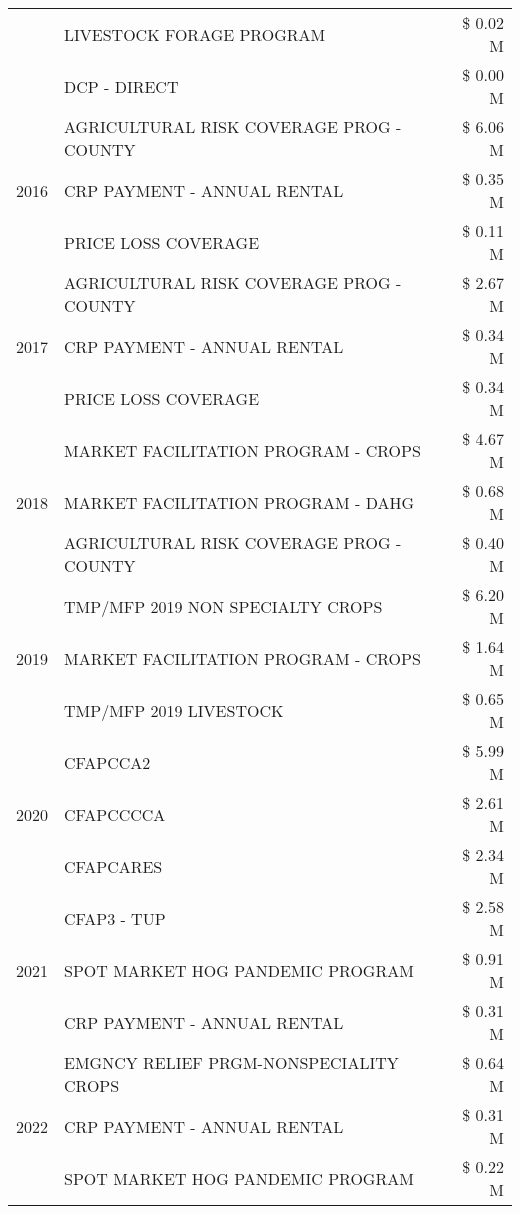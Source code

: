 \begin{tabular}{llr}
 & LIVESTOCK FORAGE PROGRAM & \$ 0.02 M \\
 & DCP - DIRECT & \$ 0.00 M \\
\cline{1-3}
\multirow[t]{3}{*}{2016} & AGRICULTURAL RISK COVERAGE PROG - COUNTY & \$ 6.06 M \\
 & CRP PAYMENT - ANNUAL RENTAL & \$ 0.35 M \\
 & PRICE LOSS COVERAGE & \$ 0.11 M \\
\cline{1-3}
\multirow[t]{3}{*}{2017} & AGRICULTURAL RISK COVERAGE PROG - COUNTY & \$ 2.67 M \\
 & CRP PAYMENT - ANNUAL RENTAL & \$ 0.34 M \\
 & PRICE LOSS COVERAGE & \$ 0.34 M \\
\cline{1-3}
\multirow[t]{3}{*}{2018} & MARKET FACILITATION PROGRAM - CROPS & \$ 4.67 M \\
 & MARKET FACILITATION PROGRAM - DAHG & \$ 0.68 M \\
 & AGRICULTURAL RISK COVERAGE PROG - COUNTY & \$ 0.40 M \\
\cline{1-3}
\multirow[t]{3}{*}{2019} & TMP/MFP 2019 NON SPECIALTY CROPS & \$ 6.20 M \\
 & MARKET FACILITATION PROGRAM - CROPS & \$ 1.64 M \\
 & TMP/MFP 2019 LIVESTOCK & \$ 0.65 M \\
\cline{1-3}
\multirow[t]{3}{*}{2020} & CFAPCCA2 & \$ 5.99 M \\
 & CFAPCCCCA & \$ 2.61 M \\
 & CFAPCARES & \$ 2.34 M \\
\cline{1-3}
\multirow[t]{3}{*}{2021} & CFAP3 - TUP & \$ 2.58 M \\
 & SPOT MARKET HOG PANDEMIC PROGRAM & \$ 0.91 M \\
 & CRP PAYMENT - ANNUAL RENTAL & \$ 0.31 M \\
\cline{1-3}
\multirow[t]{3}{*}{2022} & EMGNCY RELIEF PRGM-NONSPECIALITY CROPS & \$ 0.64 M \\
 & CRP PAYMENT - ANNUAL RENTAL & \$ 0.31 M \\
 & SPOT MARKET HOG PANDEMIC PROGRAM & \$ 0.22 M \\
\cline{1-3}
\bottomrule
\end{tabular}
